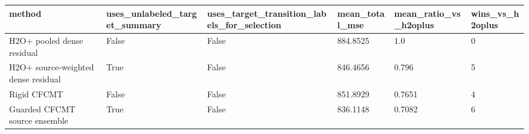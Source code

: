 \begin{tabular}{llllll}
\toprule
method & uses\_unlabeled\_target\_summary & uses\_target\_transition\_labels\_for\_selection & mean\_total\_mse & mean\_ratio\_vs\_h2oplus & wins\_vs\_h2oplus \\
\midrule
H2O+ pooled dense residual & False & False & 884.8525 & 1.0 & 0 \\
H2O+ source-weighted dense residual & True & False & 846.4656 & 0.796 & 5 \\
Rigid CFCMT & False & False & 851.8929 & 0.7651 & 4 \\
Guarded CFCMT source ensemble & True & False & 836.1148 & 0.7082 & 6 \\
\bottomrule
\end{tabular}
